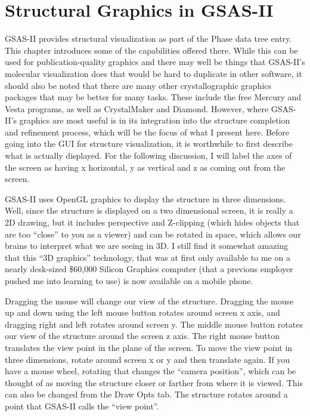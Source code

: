 \chapter{Structural Graphics in GSAS-II}\label{Chap:structureplotting}

GSAS-II provides structural visualization as part of the Phase data tree entry. This chapter introduces some of the capabilities offered there. 
While this can be used for publication-quality graphics and there may well be things that GSAS-II's molecular visualization does that would be hard to duplicate in other software, it should also be noted that there are many other crystallographic graphics packages that may be better for many tasks. These include the free Mercury and Vesta programs, as well as CrystalMaker and Diamond. However, where GSAS-II's graphics are most useful is in its integration into the structure completion and refinement process, which will be the focus of what I present here. Before going into the GUI for structure visualization, it is worthwhile to first describe what is actually displayed. 
For the following discussion, I will label the axes of the screen as having x horizontal, y as vertical and z as coming out from the screen.

GSAS-II uses OpenGL graphics to display the structure in three dimensions. Well, since the structure is displayed on a two dimensional screen, it is really a 2D drawing, but it includes perspective and Z-clipping (which hides objects that are too ``close'' to you as a viewer) and can be rotated in space, which allows our brains to interpret what we are seeing in 3D. I still find it somewhat amazing that this ``3D graphics'' technology, that was at first only available to me on a nearly desk-sized \$60,000 Silicon Graphics computer (that a previous employer pushed me into learning to use) is now available on a mobile phone. 

Dragging the mouse will change our view of the structure. Dragging the mouse up and down using the left mouse button rotates around screen x axis, and dragging right and left rotates around screen y.  The middle mouse button rotates our view of the structure around the screen z axis. The right mouse button translates the view point in the plane of the screen. To move the view point in three dimensions, rotate around screen x or y and then translate again. If you have a mouse wheel, rotating that changes the ``camera position'', which can be thought of as moving the structure closer or farther from where it is viewed. This can also be changed from the Draw Opts tab. The structure rotates around a point that GSAS-II calls the ``view point''.

